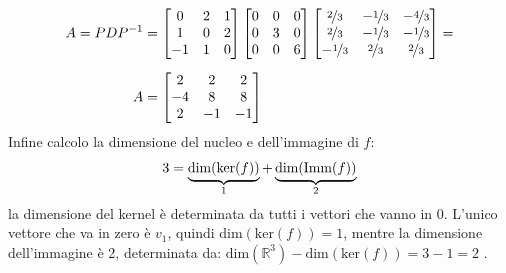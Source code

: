 \documentclass[italian]{article}
\newcommand{\ins}[1]{\text{$\mathbb{#1}$}}
\renewcommand{\dim}[1]{\text{dim$\left(#1\right)$}}
\renewcommand{\ker}[1]{\text{ker$\left(#1\right)$}}
\newcommand{\imm}[1]{\text{Imm$\left(#1\right)$}}
\begin{document}
\begin{gather*}
	\begin{split}
		A = PDP^{-1} &= 
		\begin{bmatrix}
			0 & 2 & 1 \\
			1 & 0 & 2 \\
			-1 & 1 & 0
		\end{bmatrix}
		\begin{bmatrix}
			0 & 0 & 0 \\
			0 & 3 & 0 \\
			0 & 0 & 6
		\end{bmatrix}
		\begin{bmatrix}
			\nicefrac{2}{3} & -\nicefrac{1}{3} & -\nicefrac{4}{3} \\
			\nicefrac{2}{3} & -\nicefrac{1}{3} & -\nicefrac{1}{3} \\
			-\nicefrac{1}{3} & \nicefrac{2}{3} & \nicefrac{2}{3}
		\end{bmatrix} = \\[2mm]
		A &=
		\begin{bmatrix}
			2 & 2 & 2 \\
			-4 & 8 & 8 \\
			2 & -1 & -1
		\end{bmatrix}
	\end{split}
\end{gather*}
Infine calcolo la dimensione del nucleo e dell'immagine di $f$:
\[
	3 = \underbrace{\dim{\ker{f}}}_{\mathclap{1}} + \underbrace{\dim{\imm{f}}}_{\mathclap{2}}
\]
la dimensione del kernel è determinata da tutti i vettori che vanno in 0. L'unico vettore che va in zero è $v_1$, quindi $\dim{\ker{f}}=1$, mentre la dimensione dell'immagine è 2, determinata da: $\dim{\ins{R}^3} - \dim{\ker{f}} = 3 - 1 = 2$ .
\end{document}
